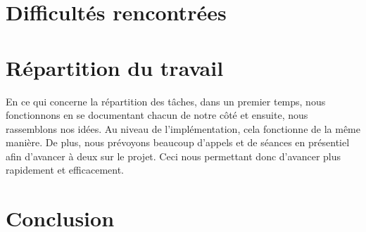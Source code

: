 \section{Difficultés rencontrées}

\section{Répartition du travail}
En ce qui concerne la répartition des tâches, dans un premier temps, nous fonctionnons en se documentant chacun de notre côté et ensuite, nous rassemblons nos idées.
Au niveau de l'implémentation, cela fonctionne de la même manière. 
De plus, nous prévoyons beaucoup d'appels et de séances en présentiel afin d'avancer à deux sur le projet.
Ceci nous permettant donc d'avancer plus rapidement et efficacement.
\section{Conclusion}
